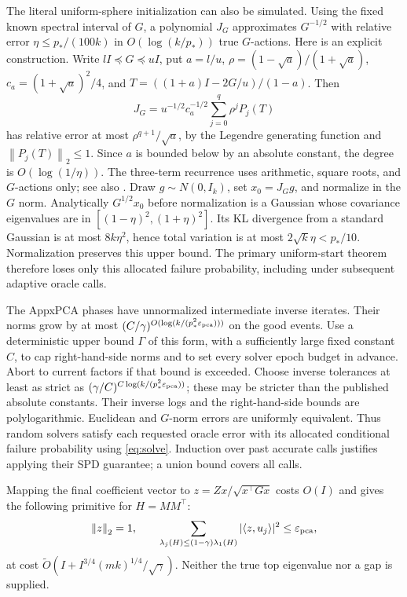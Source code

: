 \documentclass[11pt]{article}
\newcommand{\norm}[1]{\left\lVert#1\right\rVert}
\begin{document}
The literal uniform-sphere initialization can also be simulated.
Using the fixed known spectral interval of \(G\), a polynomial
\(J_G\) approximates \(G^{-1/2}\) with relative error
\(\eta\leq p_*/(100k)\) in \(O(\log(k/p_*))\) true \(G\)-actions.
Here is an explicit construction. Write \(lI\preceq G\preceq uI\),
put \(a=l/u\), \(\rho=(1-\sqrt a)/(1+\sqrt a)\),
\(c_a=(1+\sqrt a)^2/4\), and
\(T=((1+a)I-2G/u)/(1-a)\). Then
\[
 J_G=u^{-1/2}c_a^{-1/2}\sum_{j=0}^{q}\rho^jP_j(T)
\]
has relative error at most \(\rho^{q+1}/\sqrt a\), by the Legendre
generating function and \(\norm{P_j(T)}_2\leq1\).
Since \(a\) is bounded below by an absolute constant, the degree is
\(O(\log(1/\eta))\). The three-term recurrence uses arithmetic,
square roots, and \(G\)-actions only; see also \cite{thresholdnote}.
Draw \(g\sim N(0,I_k)\), set \(x_0=J_Gg\), and normalize in the
\(G\) norm. Analytically \(G^{1/2}x_0\) before normalization is a
Gaussian whose covariance eigenvalues are in
\([(1-\eta)^2,(1+\eta)^2]\). Its KL divergence from a standard Gaussian
is at most \(8k\eta^2\), hence total variation is at most
\(2\sqrt{k}\eta<p_*/10\). Normalization preserves this upper bound.
The primary uniform-start theorem therefore loses only this allocated
failure probability, including under subsequent adaptive oracle calls.

The AppxPCA phases have unnormalized intermediate inverse iterates.
Their norms grow by at most \((C/\gamma)^{O(\log(k/(p_*^2
\varepsilon_{\rm pca})))}\) on the good events.
Use a deterministic upper bound \(\Gamma\) of this form, with a
sufficiently large fixed constant \(C\), to cap right-hand-side norms
and to set every solver epoch budget in advance. Abort to current
factors if that bound is exceeded.
Choose inverse tolerances at least as strict as
\((\gamma/C)^{C\log(k/(p_*^2\varepsilon_{\rm pca}))}\);
these may be stricter than the published absolute constants.
Their inverse logs and the right-hand-side bounds are polylogarithmic.
Euclidean and \(G\)-norm errors are uniformly equivalent.
Thus random solvers satisfy each requested oracle error with its
allocated conditional failure probability using \eqref{eq:solve}.
Induction over past accurate calls justifies applying their SPD guarantee;
a union bound covers all calls.

Mapping the final coefficient vector to \(z=Zx/\sqrt{x^\top Gx}\)
costs \(O(I)\) and gives the following primitive for \(H=MM^\top\):
\begin{equation}\label{eq:cpca}
 \norm z_2=1,\qquad
 \sum_{\lambda_j(H)\leq(1-\gamma)\lambda_1(H)}
           |\langle z,u_j\rangle|^2\leq\varepsilon_{\rm pca},
\end{equation}
at cost
\(\widetilde O(I+I^{3/4}(mk)^{1/4}/\sqrt\gamma)\).
Neither the true top eigenvalue nor a gap is supplied.
\end{document}
